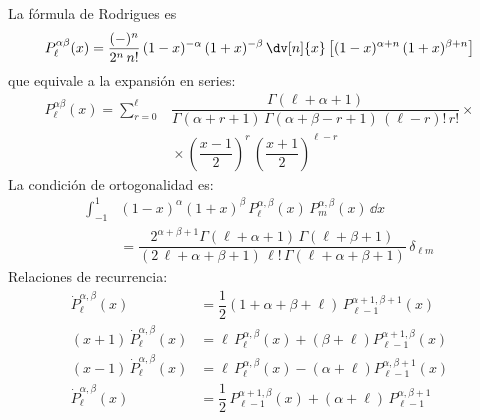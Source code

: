 \par
La fórmula de Rodrigues es
\[ P_{\ell}^{\alpha \beta} (x) = \dfrac{(-)^{n}}{2^{n} \, n!} \, (1 - x)^{-\alpha} \, (1 + x)^{- \beta} \, \dv[n]{x} \left[ (1 -x)^{\alpha+n} \, (1+ x)^{\beta+n}  \right] \]
que equivale a la expansión en series:
\begin{align*}
P_{\ell}^{\alpha \beta} (x) = \sum_{r=0}^{\ell} &\dfrac{\Gamma (\ell + \alpha + 1)}{\Gamma (\alpha + r + 1) \, \Gamma (\alpha + \beta - r + 1) \, (\ell -r)! \, r!} \times \\
&{} \times \left( \dfrac{x - 1}{2} \right)^{r} \, \left( \dfrac{x+1}{2} \right)^{\ell-r}
\end{align*}
La condición de ortogonalidad es:
\begin{align*}
\int_{-1}^{1} &(1 - x)^{\alpha} (1 + x)^{\beta} \, P_{\ell}^{\alpha, \beta} (x) \, P_{m}^{\alpha, \beta} (x) \, \dd x \\
&= \dfrac{2^{\alpha+\beta+1} \Gamma (\ell + \alpha + 1) \, \Gamma (\ell + \beta + 1)}{(2 \, \ell + \alpha +\beta + 1) \, \ell! \, \Gamma (\ell + \alpha + \beta + 1)} \, \delta_{\ell  m}
\end{align*}
Relaciones de recurrencia:
\begin{align*}
\dot{P}_{\ell}^{\alpha, \beta} (x) &= \dfrac{1}{2} (1 + \alpha + \beta + \ell) \, P_{\ell-1}^{\alpha+1, \beta+1}(x) \\[1em]
(x + 1) \, \dot{P}_{\ell}^{\alpha, \beta} (x) &= \ell \, P_{\ell}^{\alpha, \beta} (x) + (\beta + \ell) P_{\ell-1}^{\alpha+1, \beta} (x) \\[1em]
(x - 1) \, \dot{P}_{\ell}^{\alpha, \beta} (x) &= \ell \, P_{\ell}^{\alpha, \beta} (x) - (\alpha + \ell) P_{\ell-1}^{\alpha, \beta+1} (x) \\[1em]
\dot{P}_{\ell}^{\alpha, \beta} (x) &= \dfrac{1}{2} \, P_{\ell-1}^{\alpha+1, \beta}(x) + (\alpha + \ell) \, P_{\ell-1}^{\alpha, \beta+1}
\end{align*}
